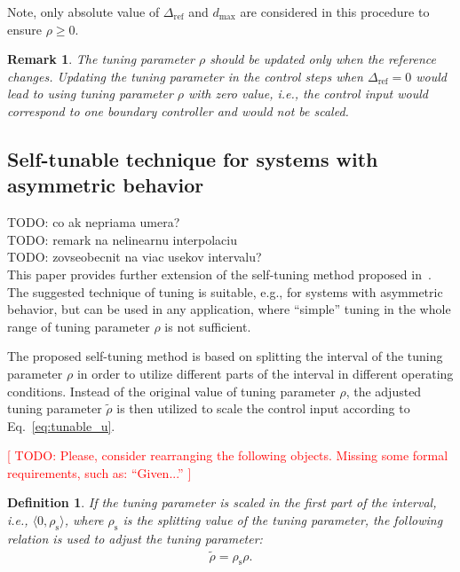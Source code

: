 \documentclass[preprint,12pt]{elsarticle}
\newtheorem{remark}[theorem]{Remark}
\newtheorem{definition}{Definition}[section]
\begin{document}
Note, only absolute value of $\Delta_{\mathrm{ref}}$ and $d_{\max}$ are considered in this procedure to ensure $\rho \ge 0$. 

\begin{remark}
	The tuning parameter $\rho$ should be updated only when the reference changes. Updating the tuning parameter in the control steps when $\Delta_{\mathrm{ref}} = 0$ would lead to using tuning parameter $\rho$ with zero value, i.e., the control input would correspond to one boundary controller and would not be scaled.
\end{remark}


\subsection{Self-tunable technique for systems with asymmetric behavior}
\label{sec:self_tunable_rho_scaling}
\noindent TODO: co ak nepriama umera? \\
TODO: remark na nelinearnu interpolaciu \\
TODO: zovseobecnit na viac usekov intervalu? \\

This paper provides further extension of the self-tuning method proposed in~\cite{self_tunable}. The suggested technique of tuning is suitable, e.g., for systems with asymmetric behavior, but can be used in any application, where ``simple'' tuning in the whole range of tuning parameter $\rho$ is not sufficient.

The proposed self-tuning method is based on splitting the interval of the tuning parameter $\rho$ in order to utilize different parts of the interval in different operating conditions. Instead of the original value of tuning parameter $\rho$, the adjusted tuning parameter $\widetilde{\rho}$ is then utilized to scale the control input according to Eq.~\eqref{eq:tunable_u}.

\textcolor{red}{[ TODO: Please, consider rearranging the following objects. Missing some formal requirements, such as: ``Given...'' ]}

\begin{definition}
	If the tuning parameter is scaled in the first part of the interval, i.e., $\langle 0, \rho_{\mathrm{s}} \rangle$, where $\rho_{\mathrm{s}}$ is the splitting value of the tuning parameter, the following relation is used to adjust the tuning parameter:
	\begin{eqnarray}
		\label{eq:rho_up}
		\widetilde{\rho} = \rho_{\mathrm{s}} \rho.
	\end{eqnarray}
\end{definition}
\end{document}
